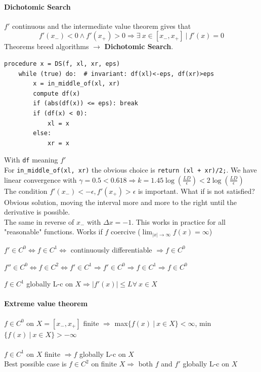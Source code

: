 \documentclass[10pt]{report}
\begin{document}
\paragraph{Dichotomic Search} $f'$ continuous and the intermediate value theorem gives that $$f'(x_-) < 0 \wedge f'(x_+) > 0 \Rightarrow \exists\:x\in[x_-, x_+]\:|\: f'(x) = 0$$
Theorems breed algorithms $\rightarrow$ \textbf{Dichotomic Search}.
\begin{lstlisting}[style=myPython]
procedure x = DS(f, xl, xr, eps)
	while (true) do:  # invariant: df(xl)<-eps, df(xr)>eps
		x = in_middle_of(xl, xr)
		compute df(x)
		if (abs(df(x)) <= eps): break
		if (df(x) < 0):
			xl = x
		else:
			xr = x
\end{lstlisting}
With \texttt{df} meaning $f'$\\
For \texttt{in\_middle\_of(xl, xr)} the obvious choice is \texttt{return (xl + xr)/2;}. We have linear convergence with $\gamma = 0.5 < 0.618 \Rightarrow k = 1.45\log(\frac{LD}{\epsilon}) < 2 \log(\frac{LD}{\epsilon})$\\
The condition $f'(x_-) < -\epsilon, f'(x_+) > \epsilon$ is important. What if is not satisfied? Obvious solution, moving the interval more and more to the right until the derivative is possible.\\
The same in reverse of $x_-$ with $\Delta x = -1$. This works in practice for all "reasonable" functions. Works if $f$ coercive ($\lim_{|x| \to \infty} f(x) = \infty$)\\
\begin{list}{}{}
	\item $f' \in C^0 \Leftrightarrow f \in C^1 \Leftrightarrow$ continuously differentiable $\Rightarrow f\in C^0$
	\item $f'' \in C^0 \Leftrightarrow f\in C^2 \Leftrightarrow f' \in C^1 \Rightarrow f' \in C^0 \Rightarrow f \in C^1 \Rightarrow f \in C^0$
	\item $f \in C^1$ globally L-c on $X \Rightarrow |f'(x)| \leq L \forall\: x \in X$
\end{list}
\paragraph{Extreme value theorem} $f \in C^0$ on $X = [x_-, x_+]$ finite $\Rightarrow$ max$\{f(x)\:|\: x\in X\} < \infty$, min$\{f(x)\:|\: x\in X\} > -\infty$\\\\
$f\in C^1$ on $X$ finite $\Rightarrow f$ globally L-c on $X$\\
Best possible case is $f\in C^2$ on finite $X\Rightarrow$ both $f$ and $f'$ globally L-c on $X$
\end{document}
